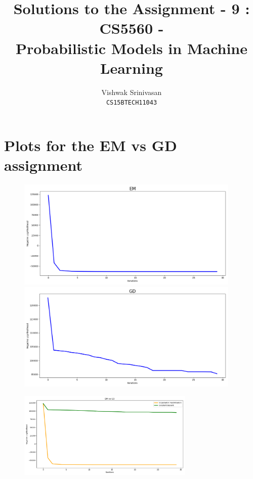 \documentclass{article}
\title{Solutions to the Assignment - 9 : CS5560 - \\
Probabilistic Models in Machine Learning}
\author{Vishwak Srinivasan\\
\texttt{CS15BTECH11043}}
\date{}
\begin{document}
\maketitle

\section*{Plots for the EM vs GD assignment}
\begin{figure}[H]
\begin{minipage}{0.475\linewidth}
\centering
\includegraphics[width=0.95\textwidth]{./images/em_plot.png}
\end{minipage}
\hfill
\begin{minipage}{0.475\linewidth}
\centering
\includegraphics[width=0.95\textwidth]{./images/gd_plot.png}
\end{minipage}
\end{figure}

\begin{figure}[H]
\centering
\includegraphics[width=0.75\textwidth]{./images/both_plots.png}
\end{figure}
\end{document}
